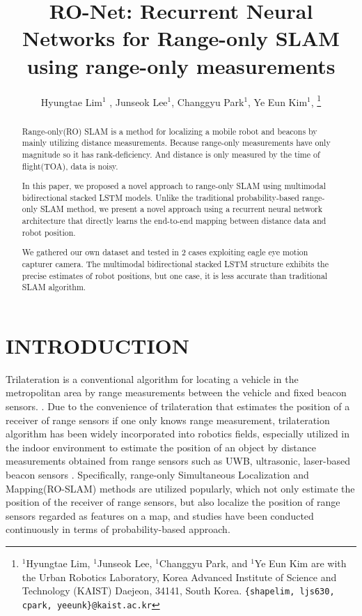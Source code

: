 \documentclass[letterpaper, 10 pt, conference]{ieeeconf}  %
\title{\LARGE \bf
RO-Net: Recurrent Neural Networks for Range-only SLAM using range-only measurements}
\author{Hyungtae Lim$^{1}$ , Junseok Lee$^{1}$, Changgyu Park$^{1}$, Ye Eun Kim$^{1}$, %
\thanks{$^{1}$Hyungtae Lim, $^{1}$Junseok Lee, $^{1}$Changgyu Park, and $^{1}$Ye Eun Kim are with
	the Urban Robotics Laboratory, Korea Advanced Institute of Science
	and Technology (KAIST) Daejeon, 34141, South Korea. {\tt\small \{shapelim, ljs630, cpark, yeeunk\}@kaist.ac.kr}}%
%
}
\begin{document}


\maketitle
\thispagestyle{empty}
\pagestyle{empty}


\begin{abstract}

Range-only(RO) SLAM is a method for localizing a mobile robot and beacons by mainly utilizing distance measurements. Because range-only measurements have only magnitude so it has rank-deficiency. And distance is only measured by the time of flight(TOA), data is noisy.

In this paper, we proposed a novel approach to range-only SLAM using multimodal bidirectional stacked LSTM models. Unlike the traditional probability-based range-only SLAM method, we present a novel approach using a recurrent neural network architecture that directly learns the end-to-end mapping between distance data and robot position.

We gathered our own dataset and tested in 2 cases exploiting eagle eye motion capturer camera. The multimodal bidirectional stacked LSTM structure exhibits the precise estimates of robot positions, but one case, it is less accurate than traditional SLAM algorithm. 


\end{abstract}


\section{INTRODUCTION}

 
 Trilateration is a conventional algorithm for locating a vehicle in the metropolitan area by range measurements between the vehicle and fixed beacon sensors. \cite{staras1972accuracy}. Due to the convenience of trilateration that estimates the position of a receiver of range sensors if one only knows range measurement, trilateration algorithm has been widely incorporated into robotics fields, especially utilized in the indoor environment to estimate the position of an object by distance measurements obtained from range sensors such as UWB, ultrasonic, laser-based beacon sensors \cite{thomas2005revisiting, cho2010mobile,raghavan2010accurate}. Specifically, range-only Simultaneous Localization and Mapping(RO-SLAM) methods are utilized popularly, which not only estimate the position of the receiver of range sensors, but also localize the position of range sensors regarded as features on a map, and studies have been conducted continuously in terms of probability-based approach\cite{blanco2008pure, blanco2008efficient,fabresse2013undelayed, shetty2018particle}.
 
\end{document}
